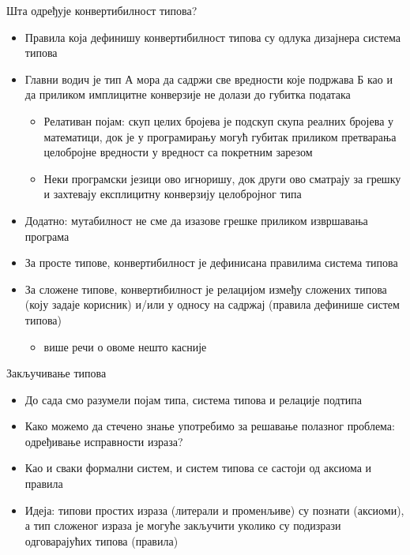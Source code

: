 \documentclass[xcolor=table]{beamer}
\begin{document}
    \begin{frame}[allowframebreaks]{Шта одређује конвертибилност типова?}
        \begin{itemize}
            \item Правила која дефинишу конвертибилност типова су одлука дизајнера система типова
            \item Главни водич је тип А мора да садржи све вредности које подржава Б као и да приликом имплицитне конверзије не долази до губитка података
            \begin{itemize}
                \item Релативан појам: скуп целих бројева је подскуп скупа реалних бројева у математици, док је у програмирању могућ губитак приликом претварања целобројне вредности у вредност са покретним зарезом
                \item Неки програмски језици ово игноришу, док други ово сматрају за грешку и захтевају експлицитну конверзију целобројног типа
            \end{itemize}
            \item Додатно: мутабилност не сме да изазове грешке приликом извршавања програма
        \end{itemize}
        
        \framebreak
        
        \begin{itemize}
            \item За просте типове, конвертибилност је дефинисана правилима система типова
            \item За сложене типове, конвертибилност је релацијом између сложених типова (коју задаје корисник) и/или у односу на садржај (правила дефинише систем типова)
            \begin{itemize}
                \item више речи о овоме нешто касније
            \end{itemize}
        \end{itemize}
    \end{frame}

    \begin{frame}{Закључивање типова}
        \begin{itemize}
            \item До сада смо разумели појам типа, система типова и релације подтипа
            \item Како можемо да стечено знање употребимо за решавање полазног проблема: одређивање исправности израза?
            \item Као и сваки формални систем, и систем типова се састоји од аксиома и правила
            \item Идеја: типови простих израза (литерали и променљиве) су познати (аксиоми), а тип сложеног израза је могуће закључити уколико су подизрази одговарајућих типова (правила)
        \end{itemize}
    \end{frame}
\end{document}
